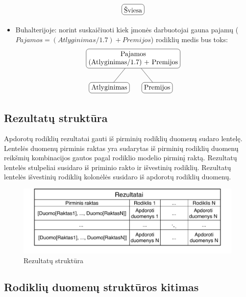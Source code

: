 \documentclass{VUMIFPSbakalaurinis}
\begin{document}
\begin{itemize}
\[\begin{tikzpicture}[sibling distance=7em, every node/.style = {shape=rectangle, rounded                                corners, draw, align=center,	
                                top color=white, bottom color=white}]
            \node{Šviesa};
        \end{tikzpicture} 	
    \]
    \item Buhalterijoje: norint suskaičiuoti kiek įmonės darbuotojai gauna pajamų (\(\textit{Pajamos} = (\textit{Atlyginimas}/1.7) + \textit{Premijos}\)) rodiklių medis bus toks: 
    \[	
        \begin{tikzpicture}[sibling distance=7em,	
            every node/.style = {shape=rectangle, rounded corners,	
                                 draw, align=center,	
                                 top color=white, bottom color=white}]	
            \node {Pajamos\\(Atlyginimas/1.7) + Premijos}	
                    child { node {Atlyginimas} }	
                    child { node {Premijos} } ;	
        \end{tikzpicture} 	
    \]
\end{itemize}  


\subsection{Rezultatų struktūra}

Apdorotų rodiklių rezultatai gauti iš pirminių rodiklių duomenų sudaro lentelę. Lentelės duomenų pirminis raktas yra sudarytas iš pirminių rodiklių duomenų reikšmių kombinacijos gautos pagal rodiklio modelio pirminį raktą. Rezultatų lentelės stulpeliai susidaro iš priminio rakto ir išvestinių rodiklių. Rezultatų lentelės išvestinių rodiklių kolonėlės susidaro iš apdorotų rodiklių duomenų.

\begin{figure}[H]
    \centering
    \includegraphics[width=1\textwidth]{img/rezultatai.pdf}
    \caption{Rezultatų struktūra}
    \label{img:rezultatai}
\end{figure}

\subsection{Rodiklių duomenų struktūros kitimas}
\end{document}
